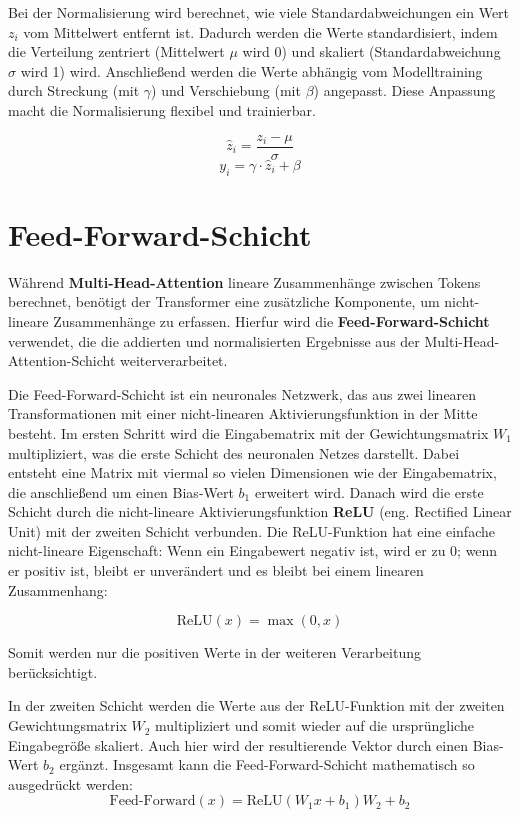 Bei der Normalisierung wird berechnet, wie viele Standardabweichungen ein Wert \( z_i \) vom Mittelwert entfernt ist. 
Dadurch werden die Werte standardisiert, indem die Verteilung zentriert (Mittelwert \( \mu \) wird 0) und skaliert (Standardabweichung \( \sigma \) wird 1) wird. 
Anschließend werden die Werte abhängig vom Modelltraining durch Streckung (mit \( \gamma \)) und Verschiebung (mit \( \beta \)) angepasst. Diese Anpassung macht die Normalisierung flexibel und trainierbar.

\[
\hat{z}_i = \frac{z_i - \mu}{\sigma}
\]
\[
y_i = \gamma \cdot \hat{z}_i + \beta
\]

\section{Feed-Forward-Schicht}

Während \textbf{Multi-Head-Attention} lineare Zusammenhänge zwischen Tokens berechnet, benötigt der Transformer eine zusätzliche Komponente, um nicht-lineare Zusammenhänge zu erfassen. 
Hierfur wird die \textbf{Feed-Forward-Schicht} verwendet, die die addierten und normalisierten Ergebnisse aus der Multi-Head-Attention-Schicht weiterverarbeitet.

Die Feed-Forward-Schicht ist ein neuronales Netzwerk, das aus zwei linearen Transformationen mit einer nicht-linearen Aktivierungsfunktion in der Mitte besteht.
Im ersten Schritt wird die Eingabematrix mit der Gewichtungsmatrix \( W_1 \) multipliziert, was die erste Schicht des neuronalen Netzes darstellt. Dabei entsteht eine Matrix mit viermal so vielen Dimensionen wie der Eingabematrix, die anschließend um einen Bias-Wert \( b_1 \) erweitert wird.
Danach wird die erste Schicht durch die nicht-lineare Aktivierungsfunktion \textbf{ReLU} (eng. Rectified Linear Unit) mit der zweiten Schicht verbunden. 
Die ReLU-Funktion hat eine einfache nicht-lineare Eigenschaft: Wenn ein Eingabewert negativ ist, wird er zu 0; wenn er positiv ist, bleibt er unverändert und es bleibt bei einem linearen Zusammenhang:

\[
\text{ReLU}(x) = \max(0, x)
\]

Somit werden nur die positiven Werte in der weiteren Verarbeitung berücksichtigt.

In der zweiten Schicht werden die Werte aus der ReLU-Funktion mit der zweiten Gewichtungsmatrix \( W_2 \) multipliziert und somit wieder auf die ursprüngliche Eingabegröße skaliert. 
Auch hier wird der resultierende Vektor durch einen Bias-Wert \( b_2 \) ergänzt.
Insgesamt kann die Feed-Forward-Schicht mathematisch so ausgedrückt werden: 
\[
\text{Feed-Forward}(x) = \text{ReLU}(W_1 x + b_1) W_2 + b_2
\]

